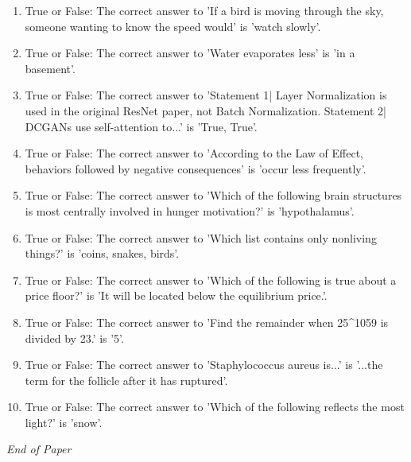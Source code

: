 \documentclass[12pt]{article}
\begin{document}
\begin{enumerate}[label=\arabic*.]
\item True or False: The correct answer to 'If a bird is moving through the sky, someone wanting to know the speed would' is 'watch slowly'.
\item True or False: The correct answer to 'Water evaporates less' is 'in a basement'.
\item True or False: The correct answer to 'Statement 1| Layer Normalization is used in the original ResNet paper, not Batch Normalization. Statement 2| DCGANs use self-attention to...' is 'True, True'.
\item True or False: The correct answer to 'According to the Law of Effect, behaviors followed by negative consequences' is 'occur less frequently'.
\item True or False: The correct answer to 'Which of the following brain structures is most centrally involved in hunger motivation?' is 'hypothalamus'.
\item True or False: The correct answer to 'Which list contains only nonliving things?' is 'coins, snakes, birds'.
\item True or False: The correct answer to 'Which of the following is true about a price floor?' is 'It will be located below the equilibrium price.'.
\item True or False: The correct answer to 'Find the remainder when 25\^{}1059 is divided by 23.' is '5'.
\item True or False: The correct answer to 'Staphylococcus aureus is...' is '...the term for the follicle after it has ruptured'.
\item True or False: The correct answer to 'Which of the following reflects the most light?' is 'snow'.
\end{enumerate}

\vfill
\noindent\textit{End of Paper}
\end{document}
